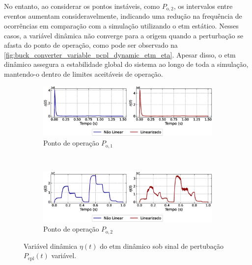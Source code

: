 No entanto, ao considerar os pontos instáveis, como $P_{\mathrm{o}, 2}$, os intervalos entre eventos aumentam consideravelmente, indicando uma redução na frequência de ocorrências em comparação com a simulação utilizando o \acrshort{etm} estático. Nesses casos, a variável dinâmica não converge para a origem quando a perturbação se afasta do ponto de operação, como pode ser observado na \autoref{fig:buck_converter_variable_pcpl_dynamic_etm_eta}. Apesar disso, o \acrshort{etm} dinâmico assegura a estabilidade global do sistema ao longo de toda a simulação, mantendo-o dentro de limites aceitáveis de operação.

\begin{figure}[H]
  \centering
  \captionsetup{justification=centering}
  \begin{subfigure}{1.\textwidth}
    \centering
    \includegraphics[width=1.\textwidth]{figuras/dynamic-etm/buck/sim2/op1/eta.eps}
    \caption{Ponto de operação $P_{\mathrm{o}, 1}$}
    \label{fig:buck_converter_variable_pcpl_dynamic_etm_eta_a}
  \end{subfigure}
  \\[6pt]
  \begin{subfigure}{1.\textwidth}
    \centering
    \includegraphics[width=1.\textwidth]{figuras/dynamic-etm/buck/sim2/op2/eta.eps}
    \caption{Ponto de operação $P_{\mathrm{o}, 2}$}
    \label{fig:buck_converter_variable_pcpl_dynamic_etm_eta_b}

  \end{subfigure}
  \caption{Variável dinâmica $\eta(t)$ do \acrshort{etm} dinâmico sob sinal de pertubação $P_{\mathrm{cpl}}(t)$ variável.}
  \label{fig:buck_converter_variable_pcpl_dynamic_etm_eta}
\end{figure}

